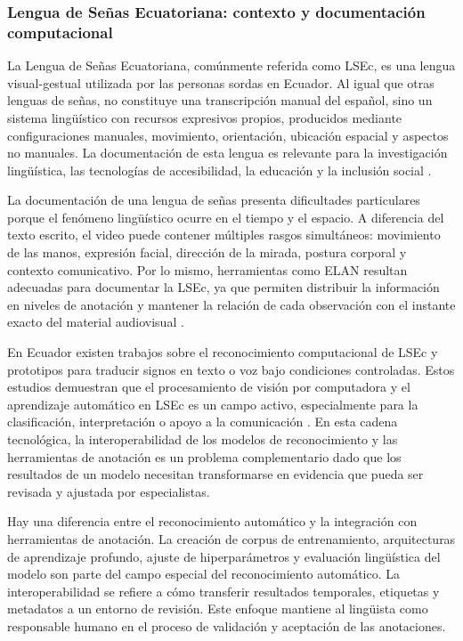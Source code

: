 \documentclass[11pt,a4paper]{article}
\begin{document}
\subsubsection{Lengua de Señas Ecuatoriana: contexto y documentación computacional}

La Lengua de Señas Ecuatoriana, comúnmente referida como LSEc, es una lengua visual-gestual utilizada por las personas sordas en Ecuador. Al igual que otras lenguas de señas, no constituye una transcripción manual del español, sino un sistema lingüístico con recursos expresivos propios, producidos mediante configuraciones manuales, movimiento, orientación, ubicación espacial y aspectos no manuales. La documentación de esta lengua es relevante para la investigación lingüística, las tecnologías de accesibilidad, la educación y la inclusión social \cite{ureta2022lsec_inclusion}.

La documentación de una lengua de señas presenta dificultades particulares porque el fenómeno lingüístico ocurre en el tiempo y el espacio. A diferencia del texto escrito, el video puede contener múltiples rasgos simultáneos: movimiento de las manos, expresión facial, dirección de la mirada, postura corporal y contexto comunicativo. Por lo mismo, herramientas como ELAN resultan adecuadas para documentar la LSEc, ya que permiten distribuir la información en niveles de anotación y mantener la relación de cada observación con el instante exacto del material audiovisual \cite{wittenburg2006elan,ureta2022lsec_inclusion}.

En Ecuador existen trabajos sobre el reconocimiento computacional de LSEc y prototipos para traducir signos en texto o voz bajo condiciones controladas. Estos estudios demuestran que el procesamiento de visión por computadora y el aprendizaje automático en LSEc es un campo activo, especialmente para la clasificación, interpretación o apoyo a la comunicación \cite{guevara2022lsec_interprete,cruz2025prototipo}. En esta cadena tecnológica, la interoperabilidad de los modelos de reconocimiento y las herramientas de anotación es un problema complementario dado que los resultados de un modelo necesitan transformarse en evidencia que pueda ser revisada y ajustada por especialistas.

Hay una diferencia entre el reconocimiento automático y la integración con herramientas de anotación. La creación de corpus de entrenamiento, arquitecturas de aprendizaje profundo, ajuste de hiperparámetros y evaluación lingüística del modelo son parte del campo especial del reconocimiento automático. La interoperabilidad se refiere a cómo transferir resultados temporales, etiquetas y metadatos a un entorno de revisión. Este enfoque mantiene al lingüista como responsable humano en el proceso de validación y aceptación de las anotaciones.
\end{document}
